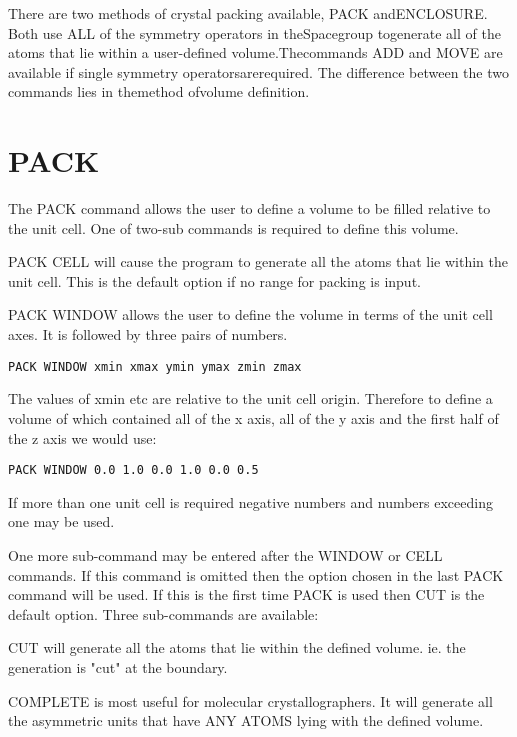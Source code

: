 \documentclass[10pt,a4paper]{report}
\begin{document}
There are two methods of crystal packing available, PACK andENCLOSURE. Both use ALL of the symmetry operators in theSpacegroup togenerate all of the atoms that lie within a user-defined volume.Thecommands ADD and MOVE are available if single symmetry operatorsarerequired. The difference between the two commands lies in themethod ofvolume definition.\section{PACK}


The PACK command allows the user to define a volume to be
filled
relative to the unit cell. One of two-sub commands is required
to define
this volume.


\bigskip{}


PACK CELL will cause the program to generate all the atoms that
lie
within the unit cell. This is the default option if no range for
packing
is input.


\bigskip{}


PACK WINDOW allows the user to define the volume in terms of the
unit
cell axes. It is followed by three pairs of numbers.
\small\begin{verbatim}
PACK WINDOW xmin xmax ymin ymax zmin zmax
\end{verbatim}\normalsize


The values of xmin etc are relative to the unit cell origin.
Therefore
to define a volume of which contained all of the x axis, all of
the y axis and
the first half of the z axis we would use:
\small\begin{verbatim}
PACK WINDOW 0.0 1.0 0.0 1.0 0.0 0.5
\end{verbatim}\normalsize


If more than one unit cell is required negative numbers and
numbers
exceeding one may be used.


One more sub-command may be entered after the WINDOW or CELL
commands.
If this command is omitted then the option chosen in the last
PACK
command will be used. If this is the first time PACK is used then
CUT is
the default option.
Three sub-commands are available:


\bigskip{}
CUT will generate all the atoms that lie within the defined
volume. ie.
the generation is "cut" at the boundary.


\bigskip{}
COMPLETE is most useful for molecular crystallographers. It will
generate all the asymmetric units that have ANY ATOMS lying with
the
defined volume.
\end{document}
